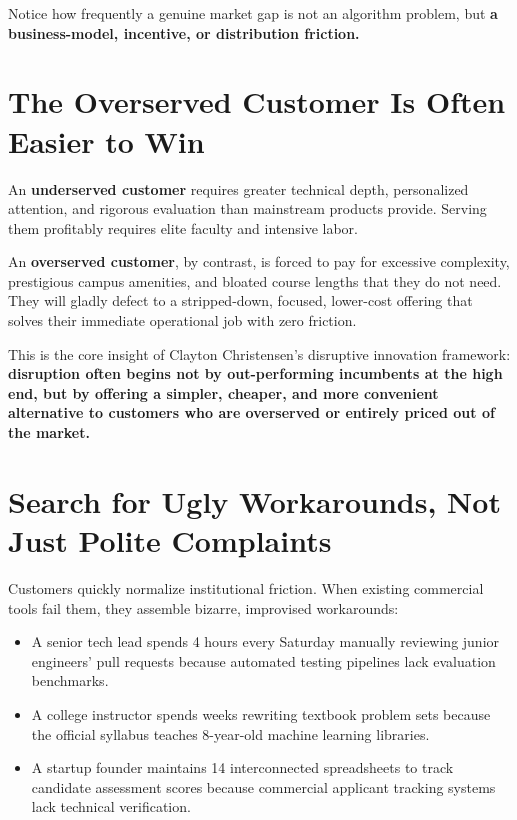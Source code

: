 Notice how frequently a genuine market gap is not an algorithm problem, but \textbf{a business-model, incentive, or distribution friction.}

\section{The Overserved Customer Is Often Easier to Win}

An \textbf{underserved customer} requires greater technical depth, personalized attention, and rigorous evaluation than mainstream products provide. Serving them profitably requires elite faculty and intensive labor.

An \textbf{overserved customer}, by contrast, is forced to pay for excessive complexity, prestigious campus amenities, and bloated course lengths that they do not need. They will gladly defect to a stripped-down, focused, lower-cost offering that solves their immediate operational job with zero friction.

This is the core insight of Clayton Christensen's disruptive innovation framework: \textbf{disruption often begins not by out-performing incumbents at the high end, but by offering a simpler, cheaper, and more convenient alternative to customers who are overserved or entirely priced out of the market.}

\section{Search for Ugly Workarounds, Not Just Polite Complaints}

Customers quickly normalize institutional friction. When existing commercial tools fail them, they assemble bizarre, improvised workarounds:
\begin{itemize}[leftmargin=12pt,itemsep=1pt,topsep=1pt]
  \item A senior tech lead spends 4 hours every Saturday manually reviewing junior engineers' pull requests because automated testing pipelines lack evaluation benchmarks.
  \item A college instructor spends weeks rewriting textbook problem sets because the official syllabus teaches 8-year-old machine learning libraries.
  \item A startup founder maintains 14 interconnected spreadsheets to track candidate assessment scores because commercial applicant tracking systems lack technical verification.
\end{itemize}


